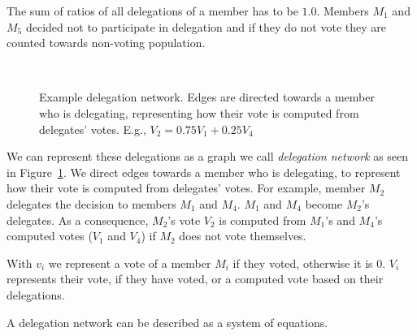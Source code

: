 \documentclass{sigchi}
\begin{document}
The sum of ratios of all delegations of a member has to be $1.0$.
Members $M_1$ and $M_5$ decided not to participate in delegation and if they do not vote they are
counted towards non-voting population.

\begin{figure}
  \centering
  \caption{Example delegation network. Edges are directed towards a member who is delegating, representing how their
  vote is computed from delegates' votes. E.g., $V_2 = 0.75 V_1 + 0.25 V_4$}~\label{fig:delegation-network}
\end{figure}

We can represent these delegations as a graph we call \emph{delegation network} as seen in
Figure~\ref{fig:delegation-network}.
We direct edges towards a member who is delegating, to represent how their vote is computed from delegates' votes.
For example, member $M_2$ delegates the decision to members $M_1$ and $M_4$.
$M_1$ and $M_4$ become $M_2$'s delegates.
As a consequence, $M_2$'s vote $V_2$ is computed from $M_1$'s and $M_4$'s computed votes ($V_1$ and $V_4$)
if $M_2$ does not vote themselves.

With $v_i$ we represent a vote of a member $M_i$ if they voted, otherwise it is $0$.
$V_i$ represents their vote, if they have voted, or a computed vote based on their delegations.

A delegation network can be described as a system of equations.

\end{document}

